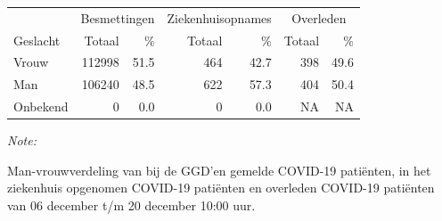 \documentclass[
  english,
  man,floatsintext]{apa6}
\begin{document}
\begin{table}
\centering\begingroup\fontsize{11}{13}\selectfont

\begin{threeparttable}
\begin{tabular}{lrrrrrr}
\toprule
\multicolumn{1}{c}{ } & \multicolumn{2}{c}{Besmettingen} & \multicolumn{2}{c}{Ziekenhuisopnames} & \multicolumn{2}{c}{Overleden} \\
\cmidrule(l{3pt}r{3pt}){2-3} \cmidrule(l{3pt}r{3pt}){4-5} \cmidrule(l{3pt}r{3pt}){6-7}
Geslacht & Totaal & \% & Totaal & \% & Totaal & \%\\
\midrule
Vrouw & 112998 & 51.5 & 464 & 42.7 & 398 & 49.6\\
Man & 106240 & 48.5 & 622 & 57.3 & 404 & 50.4\\
Onbekend & 0 & 0.0 & 0 & 0.0 & NA & NA\\
\bottomrule
\end{tabular}
\begin{tablenotes}
\item \textit{Note: } 
\item Man-vrouwverdeling van bij de GGD’en gemelde COVID-19 patiënten, in het ziekenhuis opgenomen COVID-19 patiënten en overleden COVID-19 patiënten van 06 december t/m 20 december 10:00 uur.
\end{tablenotes}
\end{threeparttable}
\endgroup{}
\end{table}
\newpage
\end{document}

